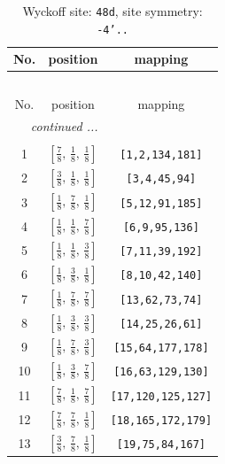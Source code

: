 \documentclass[fleqn,8pt]{jsarticle}
\begin{document}
\begin{longtable}{ccc}
\caption{Wyckoff site: {\tt 48d}, site symmetry: {\tt -4'..}}
 \\
 \hline \hline
No. & position & mapping \\ \hline \endfirsthead

\multicolumn{2}{l}{\tablename\ \thetable{}} \\
 \hline \hline
No. & position & mapping \\ \hline \endhead

 \hline \hline
\multicolumn{2}{r}{\footnotesize\it continued ...} \\ \endfoot

 \hline \hline
\multicolumn{2}{r}{} \\ \endlastfoot

1 & $\left[ \frac{7}{8},\, \frac{1}{8},\, \frac{1}{8} \right]$ & {\tt [1,2,134,181]} \\ \hline
2 & $\left[ \frac{3}{8},\, \frac{1}{8},\, \frac{1}{8} \right]$ & {\tt [3,4,45,94]} \\ \hline
3 & $\left[ \frac{1}{8},\, \frac{7}{8},\, \frac{1}{8} \right]$ & {\tt [5,12,91,185]} \\ \hline
4 & $\left[ \frac{1}{8},\, \frac{1}{8},\, \frac{7}{8} \right]$ & {\tt [6,9,95,136]} \\ \hline
5 & $\left[ \frac{1}{8},\, \frac{1}{8},\, \frac{3}{8} \right]$ & {\tt [7,11,39,192]} \\ \hline
6 & $\left[ \frac{1}{8},\, \frac{3}{8},\, \frac{1}{8} \right]$ & {\tt [8,10,42,140]} \\ \hline
7 & $\left[ \frac{1}{8},\, \frac{7}{8},\, \frac{7}{8} \right]$ & {\tt [13,62,73,74]} \\ \hline
8 & $\left[ \frac{1}{8},\, \frac{3}{8},\, \frac{3}{8} \right]$ & {\tt [14,25,26,61]} \\ \hline
9 & $\left[ \frac{1}{8},\, \frac{7}{8},\, \frac{3}{8} \right]$ & {\tt [15,64,177,178]} \\ \hline
10 & $\left[ \frac{1}{8},\, \frac{3}{8},\, \frac{7}{8} \right]$ & {\tt [16,63,129,130]} \\ \hline
11 & $\left[ \frac{7}{8},\, \frac{1}{8},\, \frac{7}{8} \right]$ & {\tt [17,120,125,127]} \\ \hline
12 & $\left[ \frac{7}{8},\, \frac{7}{8},\, \frac{1}{8} \right]$ & {\tt [18,165,172,179]} \\ \hline
13 & $\left[ \frac{3}{8},\, \frac{7}{8},\, \frac{1}{8} \right]$ & {\tt [19,75,84,167]} \\ \hline

\end{longtable}
\end{document}
